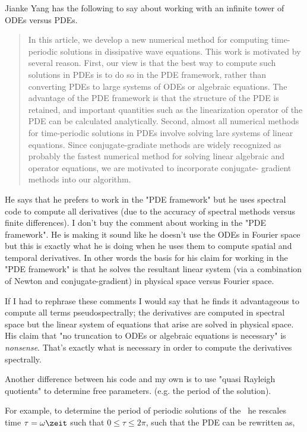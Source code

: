 \begin{description}
{Jianke Yang has the following to say about working with an infinite tower of ODEs versus PDEs.

\begin{quote}
In this article, we develop a new numerical method for computing
time-periodic solutions in dissipative wave equations. This work is motivated by several reason. First, our view is that the best way
to compute such solutions in PDEs is to do so in the PDE framework,
rather than converting PDEs to large systems of ODEs or algebraic
equations. The advantage of the PDE framework is that the structure
of the PDE is retained, and important quantities such as the
linearization operator of the PDE can be calculated analytically.
Second, almost all numerical methods for time-periodic solutions
in PDEs involve solving lare systems of linear equations. Since
conjugate-gradiate methods are widely recognized as probably
the fastest numerical method for solving linear algebraic
and operator equations, we are motivated to incorporate conjugate-
gradient methods into our algorithm.
\end{quote}

He says that he prefers to work in the "PDE framework" but he uses
spectral code to compute all derivatives (due to the accuracy of
spectral methods versus finite differences). I don't buy the
comment about working in the "PDE framework". He is making it sound
like he doesn't use the ODEs in Fourier space but this is exactly
what he is doing when he uses them to compute spatial and temporal
derivatives. In other words the basis for his claim for working
in the "PDE framework" is that he solves the resultant linear system
(via a combination of Newton and conjugate-gradient)
in physical space versus Fourier space.

If I had to rephrase these comments I would say that he finds it
advantageous to compute all terms pseudospectrally; the derivatives
are computed in spectral space but the linear system of equations that
arise are solved in physical space. His claim that "no truncation to
ODEs or algebraic equations is necessary" is \emph{nonsense}. That's exactly
what is necessary in order to compute the derivatives spectrally.

Another difference between his code and my own is to use "quasi Rayleigh
quotients" to determine free parameters. (e.g. the period of the solution).

For example, to determine the period of periodic solutions of the
\KSe\ he rescales time $\tau = \omega \zeit$ such that $0 \leq \tau \leq 2 \pi$, such that the PDE can be rewritten as,

}
\end{description}
